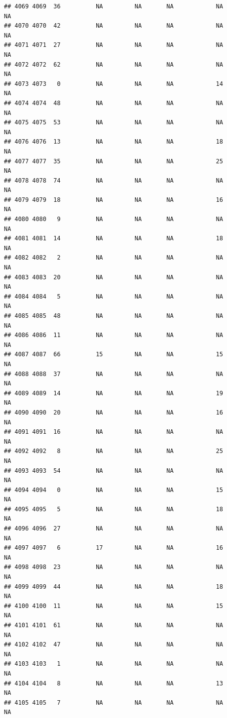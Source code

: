 \documentclass[man]{apa6}
\begin{document}
\begin{verbatim}
## 4069 4069  36          NA         NA       NA            NA       NA
## 4070 4070  42          NA         NA       NA            NA       NA
## 4071 4071  27          NA         NA       NA            NA       NA
## 4072 4072  62          NA         NA       NA            NA       NA
## 4073 4073   0          NA         NA       NA            14       NA
## 4074 4074  48          NA         NA       NA            NA       NA
## 4075 4075  53          NA         NA       NA            NA       NA
## 4076 4076  13          NA         NA       NA            18       NA
## 4077 4077  35          NA         NA       NA            25       NA
## 4078 4078  74          NA         NA       NA            NA       NA
## 4079 4079  18          NA         NA       NA            16       NA
## 4080 4080   9          NA         NA       NA            NA       NA
## 4081 4081  14          NA         NA       NA            18       NA
## 4082 4082   2          NA         NA       NA            NA       NA
## 4083 4083  20          NA         NA       NA            NA       NA
## 4084 4084   5          NA         NA       NA            NA       NA
## 4085 4085  48          NA         NA       NA            NA       NA
## 4086 4086  11          NA         NA       NA            NA       NA
## 4087 4087  66          15         NA       NA            15       NA
## 4088 4088  37          NA         NA       NA            NA       NA
## 4089 4089  14          NA         NA       NA            19       NA
## 4090 4090  20          NA         NA       NA            16       NA
## 4091 4091  16          NA         NA       NA            NA       NA
## 4092 4092   8          NA         NA       NA            25       NA
## 4093 4093  54          NA         NA       NA            NA       NA
## 4094 4094   0          NA         NA       NA            15       NA
## 4095 4095   5          NA         NA       NA            18       NA
## 4096 4096  27          NA         NA       NA            NA       NA
## 4097 4097   6          17         NA       NA            16       NA
## 4098 4098  23          NA         NA       NA            NA       NA
## 4099 4099  44          NA         NA       NA            18       NA
## 4100 4100  11          NA         NA       NA            15       NA
## 4101 4101  61          NA         NA       NA            NA       NA
## 4102 4102  47          NA         NA       NA            NA       NA
## 4103 4103   1          NA         NA       NA            NA       NA
## 4104 4104   8          NA         NA       NA            13       NA
## 4105 4105   7          NA         NA       NA            NA       NA

\end{verbatim}
\end{document}
